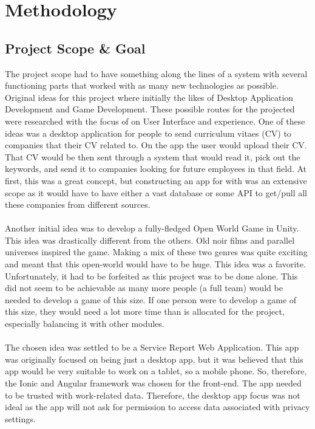 \documentclass{article}
\begin{document}
\newpage
\section{Methodology}
\subsection{Project Scope \& Goal}
The project scope had to have something along the lines of a system with several functioning parts that worked with as many new technologies as possible. Original ideas for this project where initially the likes of Desktop Application Development and Game Development. These possible routes for the projected were researched with the focus of on User Interface and experience. One of these ideas was a desktop application for people to send curriculum vitaes (CV) to companies that their CV related to. On the app the user would upload their CV. That CV would be then sent through a system that would read it, pick out the keywords, and send it to companies looking for future employees in that field. At first, this was a great concept, but constructing an app for with was an extensive scope as it would have to have either a vast database or some API to get/pull all these companies from different sources. 
\\\\ Another initial idea was to develop a fully-fledged Open World Game in Unity. This idea was drastically different from the others. Old noir films and parallel universes inspired the game. Making a mix of these two genres was quite exciting and meant that this open-world would have to be huge. This idea was a favorite. Unfortunately, it had to be forfeited as this project was to be done alone. This did not seem to be achievable as many more people (a full team) would be needed to develop a game of this size. If one person were to develop a game of this size, they would need a lot more time than is allocated for the project, especially balancing it with other modules.
\\\\ The chosen idea was settled to be a Service Report Web Application. This app was originally focused on being just a desktop app, but it was believed that this app would be very suitable to work on a tablet, so a mobile phone. So, therefore, the Ionic and Angular framework was chosen for the front-end. The app needed to be trusted with work-related data. Therefore, the desktop app focus was not ideal as the app will not ask for permission to access data associated with privacy settings.
\end{document}
